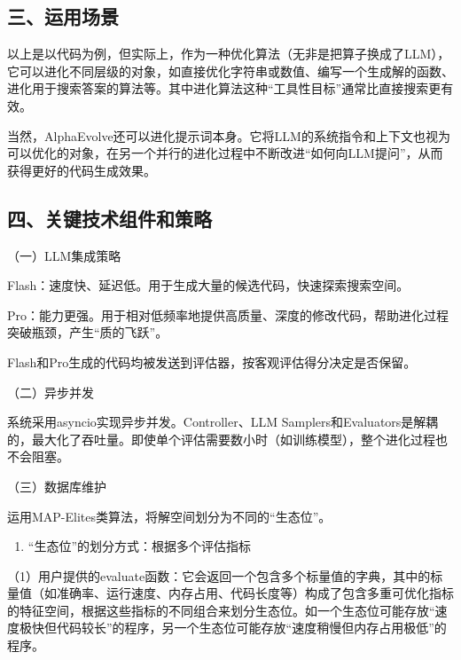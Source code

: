 \hypertarget{ux4e09ux8fd0ux7528ux573aux666f}{%
\subsection{三、运用场景}\label{ux4e09ux8fd0ux7528ux573aux666f}}

以上是以代码为例，但实际上，作为一种优化算法（无非是把算子换成了LLM），它可以进化不同层级的对象，如直接优化字符串或数值、编写一个生成解的函数、进化用于搜索答案的算法等。其中进化算法这种``工具性目标''通常比直接搜索更有效。

当然，AlphaEvolve还可以进化提示词本身。它将LLM的系统指令和上下文也视为可以优化的对象，在另一个并行的进化过程中不断改进``如何向LLM提问''，从而获得更好的代码生成效果。

\hypertarget{ux56dbux5173ux952eux6280ux672fux7ec4ux4ef6ux548cux7b56ux7565}{%
\subsection{四、关键技术组件和策略}\label{ux56dbux5173ux952eux6280ux672fux7ec4ux4ef6ux548cux7b56ux7565}}

（一）LLM集成策略

Flash：速度快、延迟低。用于生成大量的候选代码，快速探索搜索空间。

Pro：能力更强。用于相对低频率地提供高质量、深度的修改代码，帮助进化过程突破瓶颈，产生``质的飞跃''。

Flash和Pro生成的代码均被发送到评估器，按客观评估得分决定是否保留。

（二）异步并发

系统采用asyncio实现异步并发。Controller、LLM Samplers和Evaluators是解耦的，最大化了吞吐量。即使单个评估需要数小时（如训练模型），整个进化过程也不会阻塞。

（三）数据库维护

运用MAP-Elites类算法，将解空间划分为不同的``生态位''。

\begin{enumerate}
\def\labelenumi{\arabic{enumi}.}
\tightlist
\item
  ``生态位''的划分方式：根据多个评估指标
\end{enumerate}

（1）用户提供的evaluate函数：它会返回一个包含多个标量值的字典，其中的标量值（如准确率、运行速度、内存占用、代码长度等）构成了包含多重可优化指标的特征空间，根据这些指标的不同组合来划分生态位。如一个生态位可能存放``速度极快但代码较长''的程序，另一个生态位可能存放``速度稍慢但内存占用极低''的程序。

